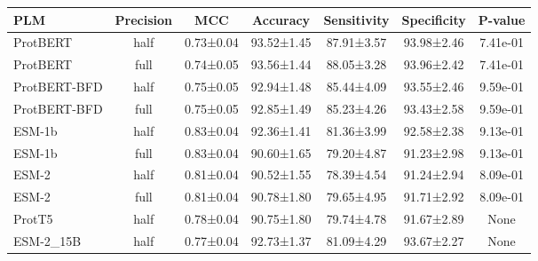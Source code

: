 \begin{tabular}{lcccccc}
\toprule
         PLM & Precision &       MCC &   Accuracy & Sensitivity & Specificity &  P-value \\
\midrule
    ProtBERT &      half & 0.73±0.04 & 93.52±1.45 &  87.91±3.57 &  93.98±2.46 & 7.41e-01 \\
    ProtBERT &      full & 0.74±0.05 & 93.56±1.44 &  88.05±3.28 &  93.96±2.42 & 7.41e-01 \\
ProtBERT-BFD &      half & 0.75±0.05 & 92.94±1.48 &  85.44±4.09 &  93.55±2.46 & 9.59e-01 \\
ProtBERT-BFD &      full & 0.75±0.05 & 92.85±1.49 &  85.23±4.26 &  93.43±2.58 & 9.59e-01 \\
      ESM-1b &      half & 0.83±0.04 & 92.36±1.41 &  81.36±3.99 &  92.58±2.38 & 9.13e-01 \\
      ESM-1b &      full & 0.83±0.04 & 90.60±1.65 &  79.20±4.87 &  91.23±2.98 & 9.13e-01 \\
       ESM-2 &      half & 0.81±0.04 & 90.52±1.55 &  78.39±4.54 &  91.24±2.94 & 8.09e-01 \\
       ESM-2 &      full & 0.81±0.04 & 90.78±1.80 &  79.65±4.95 &  91.71±2.92 & 8.09e-01 \\
      ProtT5 &      half & 0.78±0.04 & 90.75±1.80 &  79.74±4.78 &  91.67±2.89 &      None \\
   ESM-2_15B &      half & 0.77±0.04 & 92.73±1.37 &  81.09±4.29 &  93.67±2.27 &      None \\
\bottomrule
\end{tabular}
